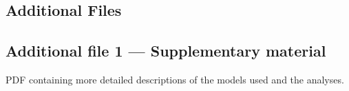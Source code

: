 \documentclass{bmcart}
\begin{document}
\begin{backmatter}

\vspace*{-12pt}


  

\section*{Additional Files}
\subsection*{Additional file 1 --- Supplementary material}
PDF containing more detailed descriptions of the models used and the analyses.

\end{backmatter}
\end{document}
